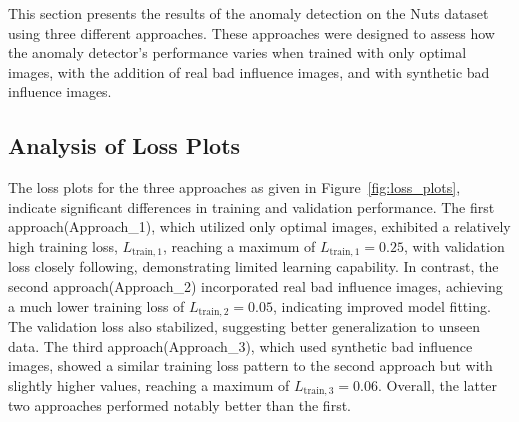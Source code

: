 \documentclass[12pt,DIV14,BCOR12mm,a4paper,footinclude=false,headinclude,parskip=half-,twoside,openright,cleardoublepage=empty,toc=index,bibliography=totoc,listof=totoc]{scrreprt}
\numberwithin{equation}{chapter}
\begin{document}
This section presents the results of the anomaly detection on the Nuts dataset using three different approaches. These approaches were designed to assess how the anomaly detector's performance varies when trained with only optimal images, with the addition of real bad influence images, and with synthetic bad influence images.

\subsection{Analysis of Loss Plots}

The loss plots for the three approaches as given in Figure~\ref{fig:loss_plots}, indicate significant differences in training and validation performance. The first approach(Approach\_1), which utilized only optimal images, exhibited a relatively high training loss, \( L_{\text{train},1} \), reaching a maximum of \( L_{\text{train},1} = 0.25 \), with validation loss closely following, demonstrating limited learning capability. In contrast, the second approach(Approach\_2) incorporated real bad influence images, achieving a much lower training loss of \( L_{\text{train},2} = 0.05 \), indicating improved model fitting. The validation loss also stabilized, suggesting better generalization to unseen data. The third approach(Approach\_3), which used synthetic bad influence images, showed a similar training loss pattern to the second approach but with slightly higher values, reaching a maximum of \( L_{\text{train},3} = 0.06 \). Overall, the latter two approaches performed notably better than the first.
\end{document}
